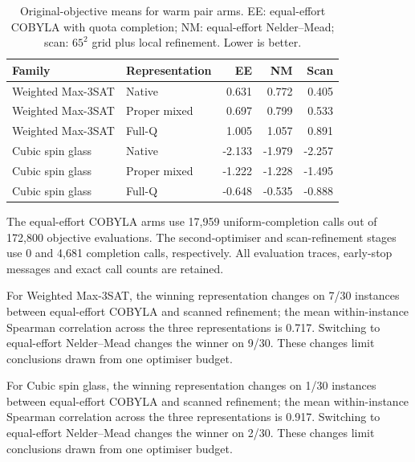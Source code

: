 \begin{table}[t]\centering\small\caption{Original-objective means for warm pair arms. EE: equal-effort COBYLA with quota completion; NM: equal-effort Nelder--Mead; scan: $65^2$ grid plus local refinement. Lower is better.}\label{tab:fresh-optimizer}

\begin{tabular}{llrrr}\toprule Family & Representation & EE & NM & Scan\\\midrule

Weighted Max-3SAT & Native & 0.631 & 0.772 & 0.405 \\

Weighted Max-3SAT & Proper mixed & 0.697 & 0.799 & 0.533 \\

Weighted Max-3SAT & Full-Q & 1.005 & 1.057 & 0.891 \\

Cubic spin glass & Native & -2.133 & -1.979 & -2.257 \\

Cubic spin glass & Proper mixed & -1.222 & -1.228 & -1.495 \\

Cubic spin glass & Full-Q & -0.648 & -0.535 & -0.888 \\

\bottomrule\end{tabular}\end{table}

The equal-effort COBYLA arms use 17,959 uniform-completion calls out of 172,800 objective evaluations. The second-optimiser and scan-refinement stages use 0 and 4,681 completion calls, respectively. All evaluation traces, early-stop messages and exact call counts are retained.

For Weighted Max-3SAT, the winning representation changes on 7/30 instances between equal-effort COBYLA and scanned refinement; the mean within-instance Spearman correlation across the three representations is 0.717. Switching to equal-effort Nelder--Mead changes the winner on 9/30. These changes limit conclusions drawn from one optimiser budget.

For Cubic spin glass, the winning representation changes on 1/30 instances between equal-effort COBYLA and scanned refinement; the mean within-instance Spearman correlation across the three representations is 0.917. Switching to equal-effort Nelder--Mead changes the winner on 2/30. These changes limit conclusions drawn from one optimiser budget.

